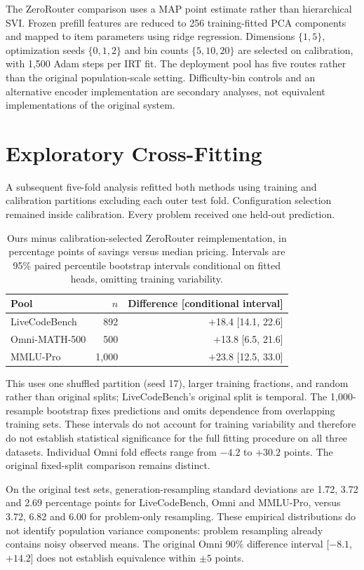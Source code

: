 \documentclass[10pt,twocolumn,letterpaper]{article}
\begin{document}
The ZeroRouter comparison uses a MAP point estimate rather than hierarchical SVI. Frozen prefill features are reduced to 256 training-fitted PCA components and mapped to item parameters using ridge regression. Dimensions $\{1,5\}$, optimization seeds $\{0,1,2\}$ and bin counts $\{5,10,20\}$ are selected on calibration, with 1,500 Adam steps per IRT fit. The deployment pool has five routes rather than the original population-scale setting. Difficulty-bin controls and an alternative encoder implementation are secondary analyses, not equivalent implementations of the original system.

\section{Exploratory Cross-Fitting}
A subsequent five-fold analysis refitted both methods using training and calibration partitions excluding each outer test fold. Configuration selection remained inside calibration. Every problem received one held-out prediction.
\begin{table}[t]
\centering
\footnotesize
\begin{tabular}{lrr}
\toprule
Pool & $n$ & Difference [conditional interval] \\
\midrule
LiveCodeBench & 892 & $+$18.4 [14.1, 22.6] \\
Omni-MATH-500 & 500 & $+$13.8 [6.5, 21.6] \\
MMLU-Pro & 1,000 & $+$23.8 [12.5, 33.0] \\
\bottomrule
\end{tabular}
\caption{Ours minus calibration-selected ZeroRouter reimplementation, in percentage points of savings versus median pricing. Intervals are 95\% paired percentile bootstrap intervals conditional on fitted heads, omitting training variability.}
\end{table}

This uses one shuffled partition (seed 17), larger training fractions, and random rather than original splits; LiveCodeBench's original split is temporal. The 1,000-resample bootstrap fixes predictions and omits dependence from overlapping training sets. These intervals do not account for training variability and therefore do not establish statistical significance for the full fitting procedure on all three datasets. Individual Omni fold effects range from $-4.2$ to $+30.2$ points. The original fixed-split comparison remains distinct.

On the original test sets, generation-resampling standard deviations are 1.72, 3.72 and 2.69 percentage points for LiveCodeBench, Omni and MMLU-Pro, versus 3.72, 6.82 and 6.00 for problem-only resampling. These empirical distributions do not identify population variance components: problem resampling already contains noisy observed means. The original Omni 90\% difference interval [$-8.1$, $+14.2$] does not establish equivalence within $\pm5$ points.
\end{document}
